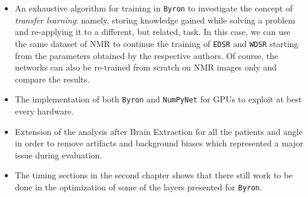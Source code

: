 \documentclass[12pt,a4paper]{report}
\begin{document}
\begin{itemize}
 \item An exhaustive algorithm for training in {\tt Byron} to investigate the concept of {\it transfer learning}: namely,  storing knowledge gained while solving a problem and re-applying it to a different, but related, task. In this case, we can use the same dataset of NMR to continue the training of {\tt EDSR} and {\tt WDSR} starting from the parameters obtained by the respective authors. 
 Of course, the networks can also be re-trained from scratch on NMR images only and compare the results.   
 \item The implementation of both {\tt Byron} and {\tt NumPyNet} for GPUs to exploit at best every hardware.
 \item Extension of the analysis after Brain Extraction for all the patients and angle in order to remove artifacts and background biases which represented a major issue during evaluation.
 \item The timing sections in the second chapter shows that there still work to be done in the optimization of some of the layers presented for {\tt Byron}. 
\end{itemize}


\newpage
\thispagestyle{empty}
\listoffigures

\newpage
\nocite{*}


\end{document}
